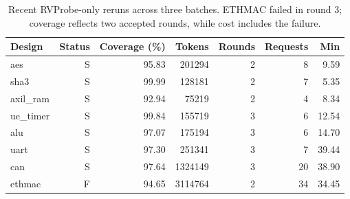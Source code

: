 \begin{table}[t]
\centering
\small
\caption{Recent RVProbe-only reruns across three batches. ETHMAC failed in round 3; coverage reflects two accepted rounds, while cost includes the failure.}
\begin{tabular}{lrrrrrr}
\hline
Design & Status & Coverage (\%) & Tokens & Rounds & Requests & Min \\
\hline
aes & S & 95.83 & 201294 & 2 & 8 & 9.59 \\
sha3 & S & 99.99 & 128181 & 2 & 7 & 5.35 \\
axil\_ram & S & 92.94 & 75219 & 2 & 4 & 8.34 \\
ue\_timer & S & 99.84 & 155719 & 3 & 6 & 12.54 \\
alu & S & 97.07 & 175194 & 3 & 6 & 14.70 \\
uart & S & 97.30 & 251341 & 3 & 7 & 39.44 \\
can & S & 97.64 & 1324149 & 3 & 20 & 38.90 \\
ethmac & F & 94.65 & 3114764 & 2 & 34 & 34.45 \\
\hline
\end{tabular}
\end{table}
